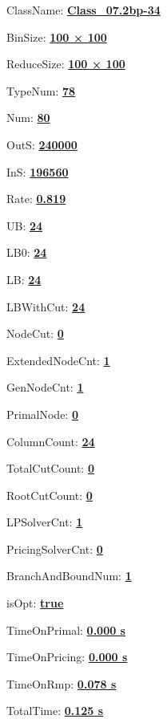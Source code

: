 \documentclass[11pt]{article}
\begin{document}
\pagestyle{empty}


ClassName: \underline{\textbf{Class_07.2bp-34}}
\par
BinSize: \underline{\textbf{100 × 100}}
\par
ReduceSize: \underline{\textbf{100 × 100}}
\par
TypeNum: \underline{\textbf{78}}
\par
Num: \underline{\textbf{80}}
\par
OutS: \underline{\textbf{240000}}
\par
InS: \underline{\textbf{196560}}
\par
Rate: \underline{\textbf{0.819}}
\par
UB: \underline{\textbf{24}}
\par
LB0: \underline{\textbf{24}}
\par
LB: \underline{\textbf{24}}
\par
LBWithCut: \underline{\textbf{24}}
\par
NodeCut: \underline{\textbf{0}}
\par
ExtendedNodeCnt: \underline{\textbf{1}}
\par
GenNodeCnt: \underline{\textbf{1}}
\par
PrimalNode: \underline{\textbf{0}}
\par
ColumnCount: \underline{\textbf{24}}
\par
TotalCutCount: \underline{\textbf{0}}
\par
RootCutCount: \underline{\textbf{0}}
\par
LPSolverCnt: \underline{\textbf{1}}
\par
PricingSolverCnt: \underline{\textbf{0}}
\par
BranchAndBoundNum: \underline{\textbf{1}}
\par
isOpt: \underline{\textbf{true}}
\par
TimeOnPrimal: \underline{\textbf{0.000 s}}
\par
TimeOnPricing: \underline{\textbf{0.000 s}}
\par
TimeOnRmp: \underline{\textbf{0.078 s}}
\par
TotalTime: \underline{\textbf{0.125 s}}
\par
\newpage


\end{document}
